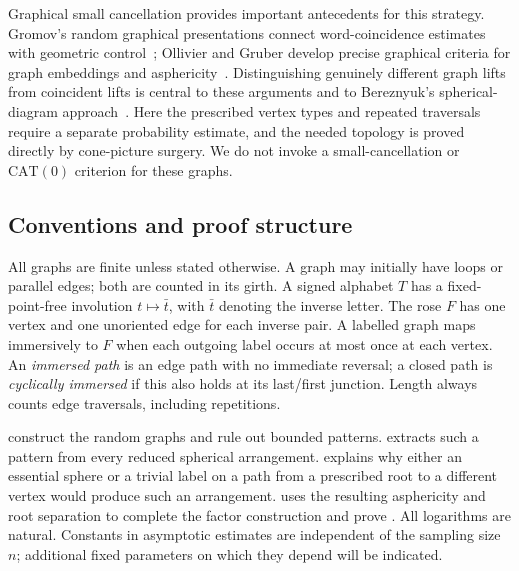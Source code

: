 \documentclass[11pt]{article}
\theoremstyle{definition}
\numberwithin{equation}{section}
\begin{document}
Graphical small cancellation provides important antecedents for this strategy. Gromov's random graphical presentations connect word-coincidence estimates with geometric control~\cite{Gromov2003}; Ollivier and Gruber develop precise graphical criteria for graph embeddings and asphericity~\cite{Ollivier2006,Gruber2015}. Distinguishing genuinely different graph lifts from coincident lifts is central to these arguments and to Bereznyuk's spherical-diagram approach~\cite{Bereznyuk2019}. Here the prescribed vertex types and repeated traversals require a separate probability estimate, and the needed topology is proved directly by cone-picture surgery. We do not invoke a small-cancellation or \(\mathrm{CAT}(0)\) criterion for these graphs.

\subsection*{Conventions and proof structure}

All graphs are finite unless stated otherwise. A graph may initially have loops or parallel edges; both are counted in its girth. A signed alphabet \(T\) has a fixed-point-free involution \(t\mapsto\bar t\), with \(\bar t\) denoting the inverse letter. The rose \(F\) has one vertex and one unoriented edge for each inverse pair. A labelled graph maps immersively to \(F\) when each outgoing label occurs at most once at each vertex. An \emph{immersed path} is an edge path with no immediate reversal; a closed path is \emph{cyclically immersed} if this also holds at its last/first junction. Length always counts edge traversals, including repetitions.

 construct the random graphs and rule out bounded patterns.  extracts such a pattern from every reduced spherical arrangement.  explains why either an essential sphere or a trivial label on a path from a prescribed root to a different vertex would produce such an arrangement.  uses the resulting asphericity and root separation to complete the factor construction and prove . All logarithms are natural. Constants in asymptotic estimates are independent of the sampling size \(n\); additional fixed parameters on which they depend will be indicated.









\end{document}
